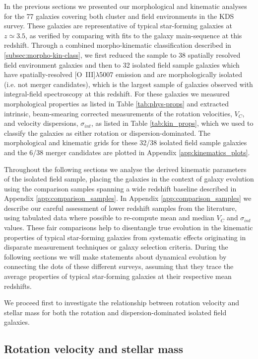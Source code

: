 \documentclass[fleqn,usenatbib]{mnras}
\begin{document}
In the previous sections we presented our morphological and kinematic analyses for the 77 galaxies covering both cluster and field environments in the KDS survey.
These galaxies are representative of typical star-forming galaxies at $z\simeq3.5$, as verified by comparing with fits to the galaxy main-sequence at this redshift.
Through a combined morpho-kinematic classification described in \cref{subsec:morpho-kin-class}, we first reduced the sample to 38 spatially resolved field environment galaxies and then to 32 isolated field sample galaxies which have spatially-resolved [O~{\sc III}]$\lambda$5007 emission and are morphologically isolated (i.e. not merger candidates), which is the largest sample of galaxies observed with integral-field spectroscopy at this redshift.
For these galaxies we measured morphological properties as listed in Table \ref{tab:phys-props} and extracted intrinsic, beam-smearing corrected measurements of the rotation velocities, $V_{C}$, and velocity dispersions, $\sigma_{int}$, as listed in Table \ref{tab:kin_props}, which we used to classify the galaxies as either rotation or dispersion-dominated.
The morphological and kinematic grids for these 32/38 isolated field sample galaxies and the 6/38 merger candidates are plotted in Appendix \ref{app:kinematics_plots}.

Throughout the following sections we analyse the derived kinematic parameters of the isolated field sample, placing the galaxies in the context of galaxy evolution using the comparison samples spanning a wide redshift baseline described in Appendix \ref{app:comparison_samples}.
In Appendix \ref{app:comparison_samples} we describe our careful assessment of lower redshift samples from the literature, using tabulated data where possible to re-compute mean and median $V_{C}$ and $\sigma_{int}$ values.
These fair comparisons help to disentangle true evolution in the kinematic properties of typical star-forming galaxies from systematic effects originating in disparate measurement techniques or galaxy selection criteria.
During the following sections we will make statements about dynamical evolution by connecting the dots of these different surveys, assuming that they trace the average properties of typical star-forming galaxies at their respective mean redshifts.

We proceed first to investigate the relationship between rotation velocity and stellar mass for both the rotation and dispersion-dominated isolated field galaxies.

\subsection{Rotation velocity and stellar mass}\label{subsec:results_rotation_vel}
\end{document}
